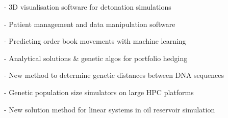 \documentclass[a4paper]{custom-resume}
\begin{document}
\begin{minipage}[t][0.82\textheight]{0.66\textwidth}
- 3D visualisation software for detonation simulations

- Patient management and data manipulation software



- Predicting order book movements with machine learning

- Analytical solutions \& genetic algos for portfolio hedging

- New method to determine genetic distances between DNA sequences

- Genetic population size simulators on large HPC platforms

- New solution method for linear systems in oil reservoir simulation

\vfill

\end{minipage}

\vfill
{}


\newpage

\vfill
\end{document}
